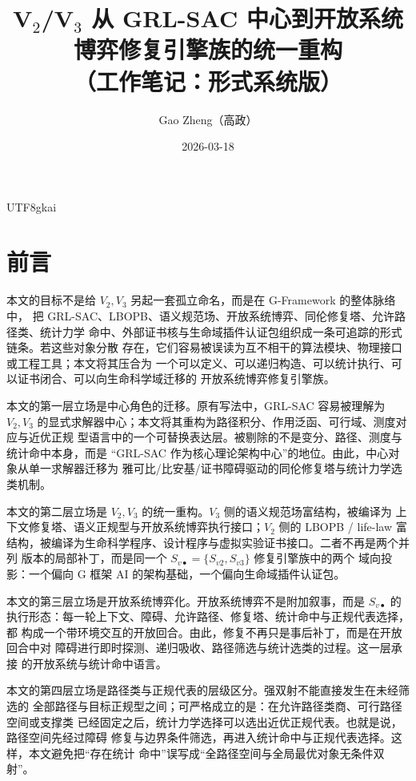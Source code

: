 \documentclass[12pt]{article}
\newcommand{\GFramework}{\textsf{G-Framework}}
\begin{document}
\begin{CJK*}{UTF8}{gkai}

\title{V\(_2\)/V\(_3\) 从 GRL-SAC 中心到开放系统博弈修复引擎族的统一重构\\
（工作笔记：形式系统版）}
\author{Gao Zheng（高政）}
\date{2026-03-18}
\maketitle

\section*{前言}

本文的目标不是给 \(V_2,V_3\) 另起一套孤立命名，而是在 \GFramework{} 的整体脉络中，
把 GRL-SAC、LBOPB、语义规范场、开放系统博弈、同伦修复塔、允许路径类、统计力学
命中、外部证书核与生命域插件认证包组织成一条可追踪的形式链条。若这些对象分散
存在，它们容易被误读为互不相干的算法模块、物理接口或工程工具；本文将其压合为
一个可以定义、可以递归构造、可以统计执行、可以证书闭合、可以向生命科学域迁移的
开放系统博弈修复引擎族。

本文的第一层立场是中心角色的迁移。原有写法中，GRL-SAC 容易被理解为 \(V_2,V_3\)
的显式求解器中心；本文将其重构为路径积分、作用泛函、可行域、测度对应与近优正规
型语言中的一个可替换表达层。被剔除的不是变分、路径、测度与统计命中本身，而是
“GRL-SAC 作为核心理论架构中心”的地位。由此，中心对象从单一求解器迁移为
雅可比/比安基/证书障碍驱动的同伦修复塔与统计力学选类机制。

本文的第二层立场是 \(V_2,V_3\) 的统一重构。\(V_3\) 侧的语义规范场富结构，被编译为
上下文修复塔、语义正规型与开放系统博弈执行接口；\(V_2\) 侧的 LBOPB / life-law
富结构，被编译为生命科学程序、设计程序与虚拟实验证书接口。二者不再是两个并列
版本的局部补丁，而是同一个 \(S_{v\bullet}=\{S_{v2},S_{v3}\}\) 修复引擎族中的两个
域向投影：一个偏向 G 框架 AI 的架构基础，一个偏向生命域插件认证包。

本文的第三层立场是开放系统博弈化。开放系统博弈不是附加叙事，而是 \(S_{v\bullet}\)
 的执行形态：每一轮上下文、障碍、允许路径、修复塔、统计命中与正规代表选择，都
构成一个带环境交互的开放回合。由此，修复不再只是事后补丁，而是在开放回合中对
障碍进行即时探测、递归吸收、路径筛选与统计选类的过程。这一层承接
\cite{RepoTex23OpenSystemGame,RepoTex28StatMechPath} 的开放系统与统计命中语言。

本文的第四层立场是路径类与正规代表的层级区分。强双射不能直接发生在未经筛选的
全部路径与目标正规型之间；可严格成立的是：在允许路径类商、可行路径空间或支撑类
已经固定之后，统计力学选择可以选出近优正规代表。也就是说，路径空间先经过障碍
修复与边界条件筛选，再进入统计命中与正规代表选择。这样，本文避免把“存在统计
命中”误写成“全路径空间与全局最优对象无条件双射”。


\end{CJK*}
\end{document}
